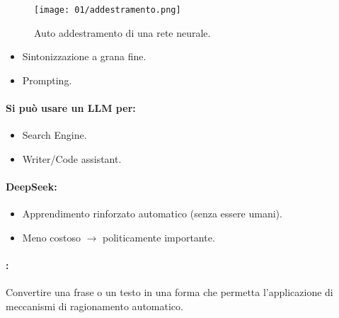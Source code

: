 \begin{figure}[h]
    \centering
    \texttt{[image: 01/addestramento.png]}
    \caption{Auto addestramento di una rete neurale.}
\end{figure}


\begin{itemize}
  \item Sintonizzazione a grana fine.
  \item Prompting.
\end{itemize}

\paragraph{Si può usare un LLM per:}

\begin{itemize}
  \item Search Engine. 
  \item Writer/Code assistant.
\end{itemize}


\paragraph{DeepSeek:}

\begin{itemize}
  \item Apprendimento rinforzato automatico (senza essere umani). 
  \item Meno costoso $\rightarrow$ politicamente importante.
\end{itemize}

\paragraph{:} Convertire una frase o un testo in una forma che
permetta l'applicazione di meccanismi di
ragionamento automatico.


